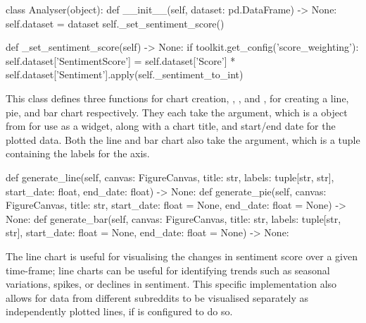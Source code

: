 \begin{python}
class Analyser(object):
    def __init__(self, dataset: pd.DataFrame) -> None:
        self.dataset = dataset
        self._set_sentiment_score()

    def _set_sentiment_score(self) -> None:
        if toolkit.get_config('score_weighting'):
            self.dataset['SentimentScore'] = self.dataset['Score'] * self.dataset['Sentiment'].apply(self._sentiment_to_int)
\end{python}

This class defines three functions for chart creation, , , and , for creating a line, pie, and bar chart respectively. They each take the  argument, which is a  object from  for use as a  widget, along with a chart title, and start/end date for the plotted data. Both the line and bar chart also take the  argument, which is a tuple containing the labels for the axis.

\begin{python}
def generate_line(self, canvas: FigureCanvas, title: str, labels: tuple[str, str], start_date: float, end_date: float) -> None:
def generate_pie(self, canvas: FigureCanvas, title: str, start_date: float = None, end_date: float = None) -> None:
def generate_bar(self, canvas: FigureCanvas, title: str, labels: tuple[str, str], start_date: float = None, end_date: float = None) -> None:
\end{python}

The line chart is useful for visualising the changes in sentiment score over a given time-frame; line charts can be useful for identifying trends such as seasonal variations, spikes, or declines in sentiment. This specific implementation also allows for data from different subreddits to be visualised separately as independently plotted lines, if  is configured to do so.

